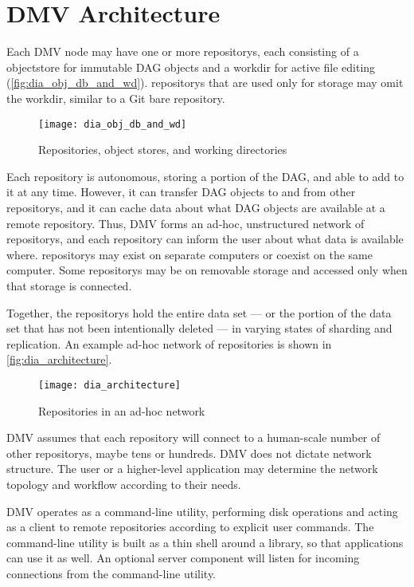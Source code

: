\chapter{DMV Architecture}


Each \gls{DMV} node may have one or more \glspl{repository}, each consisting of
a  \gls{objectstore} for
immutable \gls{DAG} objects and a \gls{workdir} for active file editing
(\autoref{fig:dia_obj_db_and_wd}). \Glspl{repository} that are used only for
storage may omit the \gls{workdir}, similar to a Git bare \gls{repository}.

\begin{figure}[h]
    \centering
    \texttt{[image: dia\_obj\_db\_and\_wd]}
    \caption{Repositories, object stores, and working directories}
    \label{fig:dia_obj_db_and_wd}
\end{figure}

Each \gls{repository} is autonomous, storing a portion of the \gls{DAG}, and
able to add to it at any time. However, it can transfer \gls{DAG} objects to and
from other \glspl{repository}, and it can cache data about what \gls{DAG}
objects are available at a remote \gls{repository}. Thus, \gls{DMV} forms an
ad-hoc, unstructured network of \glspl{repository}, and each \gls{repository}
can inform the user about what data is available where. \Glspl{repository} may
exist on separate computers or coexist on the same computer. Some
\glspl{repository} may be on removable storage and accessed only when that
storage is connected.

Together, the \glspl{repository} hold the entire data set --- or the portion of
the data set that has not been intentionally deleted --- in varying states of
sharding and replication. An example ad-hoc network of repositories is shown in
\autoref{fig:dia_architecture}.

\begin{figure}[h]
    \centering
    \texttt{[image: dia\_architecture]}
    \caption{Repositories in an ad-hoc network}
    \label{fig:dia_architecture}
\end{figure}

\gls{DMV} assumes that each \gls{repository} will connect to a human-scale
number of other \glspl{repository}, maybe tens or hundreds. \gls{DMV} does not
dictate network structure. The user or a higher-level application may determine
the network topology and workflow according to their needs.

\gls{DMV} operates as a command-line utility, performing disk operations and
acting as a client to remote repositories according to explicit user commands.
The command-line utility is built as a thin shell around a library, so that
applications can use it as well. An optional server component will listen for
incoming connections from the command-line utility.
